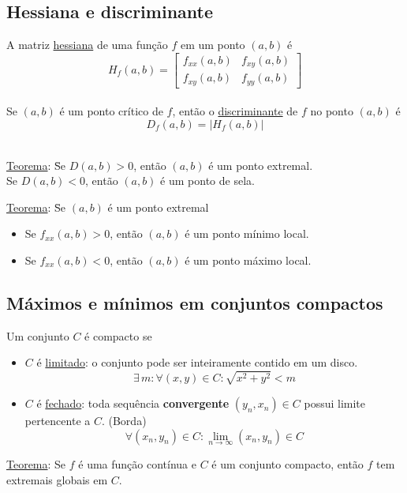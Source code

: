 \documentclass{article}
\begin{document}
\subsection{Hessiana e discriminante}
A matriz \uline{hessiana} de uma função $f$ em um ponto $(a,b)$ é
\[ H_f(a,b) = \begin{bmatrix}
                f_{xx}(a,b) & f_{xy}(a,b) \\
                f_{xy}(a,b) & f_{yy}(a,b)
              \end{bmatrix} \] \\[5pt]
Se $(a,b)$ é um ponto crítico de $f$, então o \uline{discriminante} de $f$ no ponto $(a,b)$ é
\[ D_f(a,b) = \big | H_f(a,b) \big | \] \\[-15pt]
\begin{tabbing}
  \uline{Teorema}: \= Se $D(a,b) > 0$, então $(a,b)$ é um ponto extremal. \\[5pt]
  \> Se $D(a,b) < 0$, então $(a,b)$ é um ponto de sela.
\end{tabbing}
\vspace{-3pt}
\begin{tabbing}
  \uline{Teorema}: \= Se $(a,b)$ é um ponto extremal \\[5pt]
  \>\begin{minipage}{\linewidth}
      \begin{itemize}
        \setlength\itemsep{2px}
        \item Se $f_{xx}(a,b) > 0$, então $(a,b)$ é um ponto mínimo local.
        \item Se $f_{xx}(a,b) < 0$, então $(a,b)$ é um ponto máximo local.
      \end{itemize}
    \end{minipage}
\end{tabbing}

\pagebreak

\subsection{Máximos e mínimos em conjuntos compactos}
Um conjunto $C$ é compacto se
\begin{itemize}
  \item $C$ é \uline{limitado}: o conjunto pode ser inteiramente contido em um disco.
  \[ \exists\, m: \forall (x,y) \in C: \sqrt{x^2 + y^2} < m \]
  
  \item $C$ é \uline{fechado}: toda sequência \textbf{convergente} $(y_n, x_n) \in C$ possui limite pertencente a $C$. (Borda)
  \[ \forall (x_n, y_n) \in C: \lim_{n \to \infty} (x_n, y_n) \in C \]
\end{itemize}
\vspace{5pt}
\uline{Teorema}: Se $f$ é uma função contínua e $C$ é um conjunto compacto, então $f$ tem extremais globais em $C$.
\end{document}
